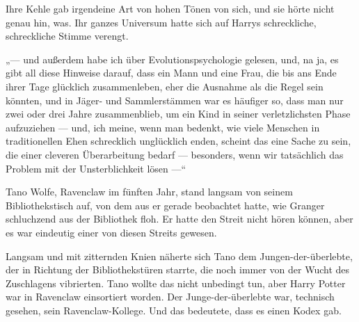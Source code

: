 Ihre Kehle gab irgendeine Art von hohen Tönen von sich, und sie hörte nicht genau hin, was. Ihr ganzes Universum hatte sich auf Harrys schreckliche, schreckliche Stimme verengt.

„— und außerdem habe ich über Evolutionspsychologie gelesen, und, na ja, es gibt all diese Hinweise darauf, dass ein Mann und eine Frau, die bis ans Ende ihrer Tage glücklich zusammenleben, eher die Ausnahme als die Regel sein könnten, und in Jäger- und Sammlerstämmen war es häufiger so, dass man nur zwei oder drei Jahre zusammenblieb, um ein Kind in seiner verletzlichsten Phase aufzuziehen — und, ich meine, wenn man bedenkt, wie viele Menschen in traditionellen Ehen schrecklich unglücklich enden, scheint das eine Sache zu sein, die einer cleveren Überarbeitung bedarf — besonders, wenn wir tatsächlich das Problem mit der Unsterblichkeit lösen —“

\later

Tano Wolfe, Ravenclaw im fünften Jahr, stand langsam von seinem Bibliothekstisch auf, von dem aus er gerade beobachtet hatte, wie Granger schluchzend aus der Bibliothek floh. Er hatte den Streit nicht hören können, aber es war eindeutig einer von diesen Streits gewesen.


Langsam und mit zitternden Knien näherte sich Tano dem Jungen-der-überlebte, der in Richtung der Bibliothekstüren starrte, die noch immer von der Wucht des Zuschlagens vibrierten. Tano wollte das nicht unbedingt tun, aber Harry Potter war in Ravenclaw einsortiert worden. Der Junge-der-überlebte war, technisch gesehen, sein Ravenclaw-Kollege. Und das bedeutete, dass es einen Kodex gab.

